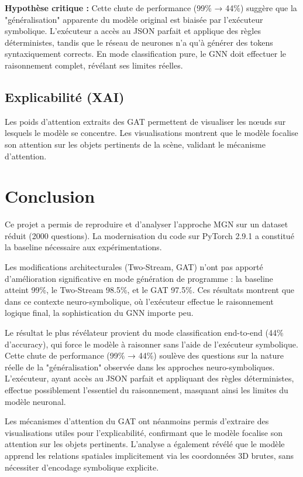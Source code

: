 \documentclass[a4paper,11pt]{article}
\begin{document}
\textbf{Hypothèse critique :} Cette chute de performance (99\% → 44\%) suggère que la "généralisation" apparente du modèle original est biaisée par l'exécuteur symbolique. L'exécuteur a accès au JSON parfait et applique des règles déterministes, tandis que le réseau de neurones n'a qu'à générer des tokens syntaxiquement corrects. En mode classification pure, le GNN doit effectuer le raisonnement complet, révélant ses limites réelles.

\subsection{Explicabilité (XAI)}
Les poids d'attention extraits des GAT permettent de visualiser les nœuds sur lesquels le modèle se concentre. Les visualisations montrent que le modèle focalise son attention sur les objets pertinents de la scène, validant le mécanisme d'attention.

\section{Conclusion}
Ce projet a permis de reproduire et d'analyser l'approche MGN sur un dataset réduit (2000 questions). La modernisation du code sur PyTorch 2.9.1 a constitué la baseline nécessaire aux expérimentations.

Les modifications architecturales (Two-Stream, GAT) n'ont pas apporté d'amélioration significative en mode génération de programme : la baseline atteint 99\%, le Two-Stream 98.5\%, et le GAT 97.5\%. Ces résultats montrent que dans ce contexte neuro-symbolique, où l'exécuteur effectue le raisonnement logique final, la sophistication du GNN importe peu.

Le résultat le plus révélateur provient du mode classification end-to-end (44\% d'accuracy), qui force le modèle à raisonner sans l'aide de l'exécuteur symbolique. Cette chute de performance (99\% → 44\%) soulève des questions sur la nature réelle de la "généralisation" observée dans les approches neuro-symboliques. L'exécuteur, ayant accès au JSON parfait et appliquant des règles déterministes, effectue possiblement l'essentiel du raisonnement, masquant ainsi les limites du modèle neuronal.

Les mécanismes d'attention du GAT ont néanmoins permis d'extraire des visualisations utiles pour l'explicabilité, confirmant que le modèle focalise son attention sur les objets pertinents. L'analyse a également révélé que le modèle apprend les relations spatiales implicitement via les coordonnées 3D brutes, sans nécessiter d'encodage symbolique explicite.
\end{document}
